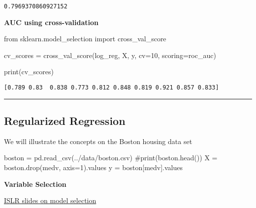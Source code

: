 \documentclass[
  letterpaper,
  DIV=11,
  numbers=noendperiod]{scrreprt}
\newenvironment{Shaded}{\begin{snugshade}}{\end{snugshade}}
\newcommand{\BuiltInTok}[1]{\textcolor[rgb]{0.00,0.23,0.31}{#1}}
\newcommand{\CommentTok}[1]{\textcolor[rgb]{0.37,0.37,0.37}{#1}}
\newcommand{\DecValTok}[1]{\textcolor[rgb]{0.68,0.00,0.00}{#1}}
\newcommand{\ImportTok}[1]{\textcolor[rgb]{0.00,0.46,0.62}{#1}}
\newcommand{\NormalTok}[1]{\textcolor[rgb]{0.00,0.23,0.31}{#1}}
\newcommand{\OperatorTok}[1]{\textcolor[rgb]{0.37,0.37,0.37}{#1}}
\newcommand{\StringTok}[1]{\textcolor[rgb]{0.13,0.47,0.30}{#1}}
\begin{document}
\begin{verbatim}
0.7969370860927152
\end{verbatim}

\textbf{AUC using cross-validation}

\begin{Shaded}
\begin{Highlighting}[]
\ImportTok{from}\NormalTok{ sklearn.model\_selection }\ImportTok{import}\NormalTok{ cross\_val\_score}

\NormalTok{cv\_scores }\OperatorTok{=}\NormalTok{ cross\_val\_score(log\_reg, X, y, cv}\OperatorTok{=}\DecValTok{10}\NormalTok{, scoring}\OperatorTok{=}\StringTok{\textquotesingle{}roc\_auc\textquotesingle{}}\NormalTok{)}

\BuiltInTok{print}\NormalTok{(cv\_scores)}
\end{Highlighting}
\end{Shaded}

\begin{verbatim}
[0.789 0.83  0.838 0.773 0.812 0.848 0.819 0.921 0.857 0.833]
\end{verbatim}

\begin{center}\rule{0.5\linewidth}{0.5pt}\end{center}

\hypertarget{regularized-regression}{%
\subsection{Regularized Regression}\label{regularized-regression}}

We will illustrate the concepts on the Boston housing data set

\begin{Shaded}
\begin{Highlighting}[]
\NormalTok{boston }\OperatorTok{=}\NormalTok{ pd.read\_csv(}\StringTok{\textquotesingle{}../data/boston.csv\textquotesingle{}}\NormalTok{)}
\CommentTok{\#print(boston.head())}
\NormalTok{X }\OperatorTok{=}\NormalTok{ boston.drop(}\StringTok{\textquotesingle{}medv\textquotesingle{}}\NormalTok{, axis}\OperatorTok{=}\DecValTok{1}\NormalTok{).values}
\NormalTok{y }\OperatorTok{=}\NormalTok{ boston[}\StringTok{\textquotesingle{}medv\textquotesingle{}}\NormalTok{].values}
\end{Highlighting}
\end{Shaded}

\textbf{Variable Selection}

\href{../figures/model_selection.pdf}{ISLR slides on model selection}
\end{document}
